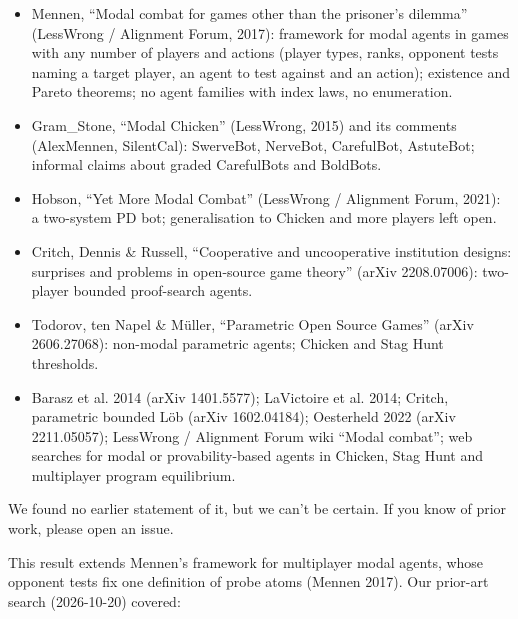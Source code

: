 \documentclass{article}
\begin{document}
\begin{itemize}
\item Mennen, ``Modal combat for games other than the prisoner's dilemma'' (LessWrong / Alignment Forum, 2017): framework for modal agents in games with any number of players and actions (player types, ranks, opponent tests naming a target player, an agent to test against and an action); existence and Pareto theorems; no agent families with index laws, no enumeration.
\item Gram\_Stone, ``Modal Chicken'' (LessWrong, 2015) and its comments (AlexMennen, SilentCal): SwerveBot, NerveBot, CarefulBot, AstuteBot; informal claims about graded CarefulBots and BoldBots.
\item Hobson, ``Yet More Modal Combat'' (LessWrong / Alignment Forum, 2021): a two-system PD bot; generalisation to Chicken and more players left open.
\item Critch, Dennis \& Russell, ``Cooperative and uncooperative institution designs: surprises and problems in open-source game theory'' (arXiv 2208.07006): two-player bounded proof-search agents.
\item Todorov, ten Napel \& Müller, ``Parametric Open Source Games'' (arXiv 2606.27068): non-modal parametric agents; Chicken and Stag Hunt thresholds.
\item Barasz et al. 2014 (arXiv 1401.5577); LaVictoire et al. 2014; Critch, parametric bounded Löb (arXiv 1602.04184); Oesterheld 2022 (arXiv 2211.05057); LessWrong / Alignment Forum wiki ``Modal combat''; web searches for modal or provability-based agents in Chicken, Stag Hunt and multiplayer program equilibrium.
\end{itemize}

We found no earlier statement of it, but we can't be certain. If you know of prior work, please open an issue.

This result extends Mennen's framework for multiplayer modal agents, whose opponent tests fix one definition of probe atoms (Mennen 2017). Our prior-art search (2026-10-20) covered:
\end{document}

